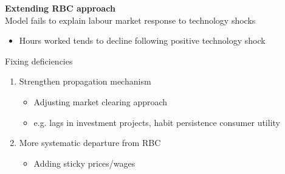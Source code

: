 \documentclass{beamer}
\begin{document}
\begin{frame}
  \textbf{Extending RBC approach}\\
  Model fails to explain labour market response to technology shocks
  \begin{itemize}
    \item Hours worked tends to decline following positive technology shock
  \end{itemize}
  \medskip
  Fixing deficiencies 
  \begin{enumerate}
    \item Strengthen propagation mechanism
    \begin{itemize}
      \item Adjusting market clearing approach
      \item e.g. lags in investment projects, habit persistence consumer utility
    \end{itemize}
    \medskip
    \item More systematic departure from RBC
    \begin{itemize}
      \item Adding sticky prices/wages
    \end{itemize}
  \end{enumerate}
\end{frame}


\end{document}
